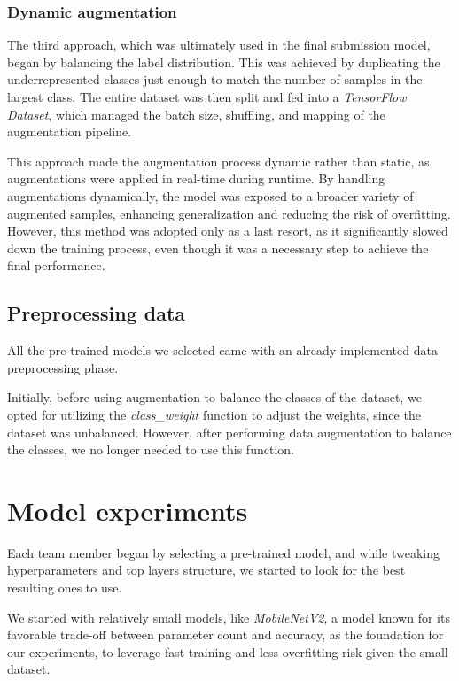 \documentclass[11pt]{article}
\begin{document}
\subsubsection{Dynamic augmentation}

The third approach, which was ultimately used in the final submission model, began by balancing the label distribution.
This was achieved by duplicating the underrepresented classes just enough to match the number of samples in the largest class.
The entire dataset was then split and fed into a \textit{TensorFlow Dataset}, which managed the batch size, shuffling, and mapping of the augmentation pipeline.

This approach made the augmentation process dynamic rather than static, as augmentations were applied in real-time during runtime. 
By handling augmentations dynamically, the model was exposed to a broader variety of augmented samples, enhancing generalization and reducing the risk of overfitting.
However, this method was adopted only as a last resort, as it significantly slowed down the training process, even though it was a necessary step to achieve the final performance.

\subsection{Preprocessing data}

All the pre-trained models we selected came with an already implemented data preprocessing phase.

Initially, before using augmentation to balance the classes of the dataset, we opted for utilizing the \textit{class\_weight} function to adjust the weights, since the dataset was unbalanced.
However, after performing data augmentation to balance the classes, we no longer needed to use this function.

\section{Model experiments}

Each team member began by selecting a pre-trained model, and while tweaking hyperparameters and top layers structure, we started to look for the best resulting ones to use.

We started with relatively small models, like \textit{MobileNetV2}, a model known for its favorable trade-off between parameter count and accuracy, as the foundation for our experiments, to leverage fast training and less overfitting risk given the small dataset.
\end{document}
